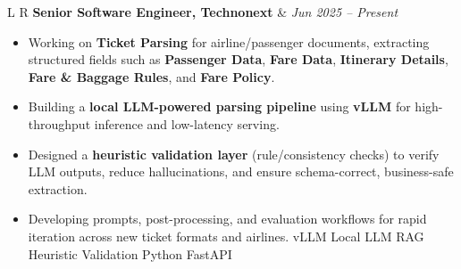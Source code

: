 \documentclass[10pt,letterpaper]{article}
\newcommand{\pill}[1]{%
  \begingroup\setlength{\fboxsep}{1.2pt}%
  \colorbox{brandblue!12}{\textcolor{brandblue}{\scriptsize #1}}%
  \endgroup
}
\begin{document}
\begin{tabularx}{\linewidth}{L R}
\fontsize{12}{10}\selectfont\textbf{Senior Software Engineer, Technonext} & \textit{Jun 2025 -- Present} \\
\end{tabularx}
\begin{itemize}
  \item Working on \textbf{Ticket Parsing} for airline/passenger documents, extracting structured fields such as
  \textbf{Passenger Data}, \textbf{Fare Data}, \textbf{Itinerary Details}, \textbf{Fare \& Baggage Rules}, and \textbf{Fare Policy}.
  \item Building a \textbf{local LLM-powered parsing pipeline} using \textbf{vLLM} for high-throughput inference and low-latency serving.
  \item Designed a \textbf{heuristic validation layer} (rule/consistency checks) to verify LLM outputs, reduce hallucinations,
  and ensure schema-correct, business-safe extraction.
  \item Developing prompts, post-processing, and evaluation workflows for rapid iteration across new ticket formats and airlines.
  \pill{vLLM} \pill{Local LLM} \pill{RAG} \pill{Heuristic Validation} \pill{Python} \pill{FastAPI}
\end{itemize}
\end{document}
